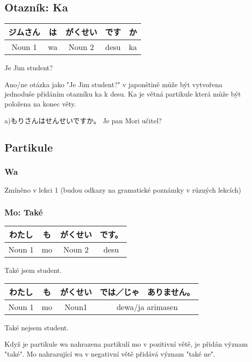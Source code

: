 \subsection{Otazník: Ka}
\begin{center}
\begin{tabular}{||c|c||c|c||c||}
\hline
ジムさん&は&がくせい&です&か\\
\hline
Noun 1&wa&Noun 2&desu&ka\\
\hline
\end{tabular}
\end{center}
Je Jim student?

Ano/ne otázka jako "Je Jim student?" v japonštině může být vytvořena jednoduše přidáním otazníku ka k desu. Ka je větná partikule která může být položena na konec věty.

a)もりさんはせんせいですか。 Je pan Mori učitel?


\subsection{Partikule}

\subsubsection{Wa} Zmíněno v lekci 1 (budou odkazy na gramatické poznámky v různých lekcích)
\subsubsection{Mo: Také}

\begin{center}
\begin{tabular}{||c|c||c|c||}
\hline
わたし&も&がくせい&です。\\
\hline
Noun 1&mo&Noun 2&desu\\
\hline
\end{tabular}
\end{center}
Také jsem student.

\begin{center}
\begin{tabular}{||c|c||c|c||}
\hline
わたし&も&がくせい&では／じゃ　ありません。\\
\hline
Noun 1&mo&Noun1 &dewa/ja arimasen\\
\hline
\end{tabular}
\end{center}
Také nejsem student.

Když je partikule wa nahrazena partikulí mo v pozitivní větě, je přidán význam "také". Mo nahrazující wa v negativní větě přidává význam "také ne". 


